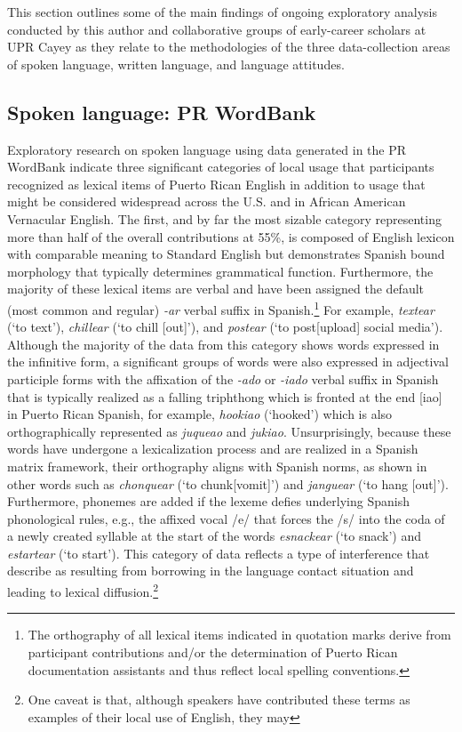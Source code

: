 \documentclass[output=paper,colorlinks,citecolor=brown]{langscibook}
\begin{document}
This section outlines some of the main findings of ongoing exploratory analysis conducted by this author and collaborative groups of early-career scholars at UPR Cayey as they relate to the methodologies of the three data-collection areas of spoken language, written language, and language attitudes.

\subsection{Spoken language: PR WordBank}

Exploratory research on spoken language using data generated in the PR WordBank indicate three significant categories of local usage that participants recognized as lexical items of Puerto Rican English in addition to usage that might be considered widespread across the U.S. and in African American Vernacular English. The first, and by far the most sizable category representing more than half of the overall contributions at 55\%, is composed of English lexicon with comparable meaning to Standard English but demonstrates Spanish bound morphology that typically determines grammatical function. Furthermore, the majority of these lexical items are verbal and have been assigned the default (most common and regular) \emph{-ar} verbal suffix in Spanish.\footnote{The orthography of all lexical items indicated in quotation marks derive from participant contributions and/or the determination of Puerto Rican documentation assistants and thus reflect local spelling conventions.} For example, \emph{textear} (‘to text’), \emph{ chillear} (‘to chill [out]’), and \emph{postear} (‘to post[upload] social media’). Although the majority of the data from this category shows words expressed in the infinitive form, a significant groups of words were also expressed in adjectival participle forms with the affixation of the \emph{-ado} or \emph{-iado} verbal suffix in Spanish that is typically realized as a falling triphthong which is fronted at the end [iao] in Puerto Rican Spanish, for example, \emph{hookiao} (‘hooked’) which is also orthographically represented as \emph{juqueao} and \emph{jukiao}. Unsurprisingly, because these words have undergone a lexicalization process and are realized in a Spanish matrix framework, their orthography aligns with Spanish norms, as shown in other words such as \emph{chonquear} (‘to chunk[vomit]’) and \emph{janguear} (‘to hang [out]’). Furthermore, phonemes are added if the lexeme defies underlying Spanish phonological rules, e.g., the affixed vocal /e/ that forces the /s/ into the coda of a newly created syllable at the start of the words \emph{esnackear} (‘to snack’) and \emph{estartear} (‘to start’). This category of data reflects a type of interference that \citep[212]{Thomason_Kaufman_1988} describe as resulting from borrowing in the language contact situation and leading to lexical diffusion.\footnote{One caveat is that, although speakers have contributed these terms as examples of their local use of English, they may 
}
\end{document}
